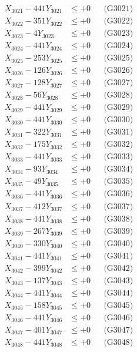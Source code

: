 \documentclass[a4paper,10pt]{article}
\begin{document}
{\begin{align}
\allowbreak
X_{3021} - 441Y_{3021} &\leq +0 && \text{(G3021)} \\
X_{3022} - 351Y_{3022} &\leq +0 && \text{(G3022)} \\
X_{3023} - 4Y_{3023} &\leq +0 && \text{(G3023)} \\
X_{3024} - 441Y_{3024} &\leq +0 && \text{(G3024)} \\
X_{3025} - 253Y_{3025} &\leq +0 && \text{(G3025)} \\
X_{3026} - 126Y_{3026} &\leq +0 && \text{(G3026)} \\
X_{3027} - 128Y_{3027} &\leq +0 && \text{(G3027)} \\
X_{3028} - 56Y_{3028} &\leq +0 && \text{(G3028)} \\
X_{3029} - 441Y_{3029} &\leq +0 && \text{(G3029)} \\
X_{3030} - 441Y_{3030} &\leq +0 && \text{(G3030)} \\
\allowbreak
X_{3031} - 322Y_{3031} &\leq +0 && \text{(G3031)} \\
X_{3032} - 175Y_{3032} &\leq +0 && \text{(G3032)} \\
X_{3033} - 441Y_{3033} &\leq +0 && \text{(G3033)} \\
X_{3034} - 93Y_{3034} &\leq +0 && \text{(G3034)} \\
X_{3035} - 49Y_{3035} &\leq +0 && \text{(G3035)} \\
X_{3036} - 441Y_{3036} &\leq +0 && \text{(G3036)} \\
X_{3037} - 412Y_{3037} &\leq +0 && \text{(G3037)} \\
X_{3038} - 441Y_{3038} &\leq +0 && \text{(G3038)} \\
X_{3039} - 267Y_{3039} &\leq +0 && \text{(G3039)} \\
X_{3040} - 330Y_{3040} &\leq +0 && \text{(G3040)} \\
\allowbreak
X_{3041} - 441Y_{3041} &\leq +0 && \text{(G3041)} \\
X_{3042} - 399Y_{3042} &\leq +0 && \text{(G3042)} \\
X_{3043} - 137Y_{3043} &\leq +0 && \text{(G3043)} \\
X_{3044} - 441Y_{3044} &\leq +0 && \text{(G3044)} \\
X_{3045} - 158Y_{3045} &\leq +0 && \text{(G3045)} \\
X_{3046} - 441Y_{3046} &\leq +0 && \text{(G3046)} \\
X_{3047} - 401Y_{3047} &\leq +0 && \text{(G3047)} \\
X_{3048} - 441Y_{3048} &\leq +0 && \text{(G3048)} \\

\end{align}}
\end{document}
